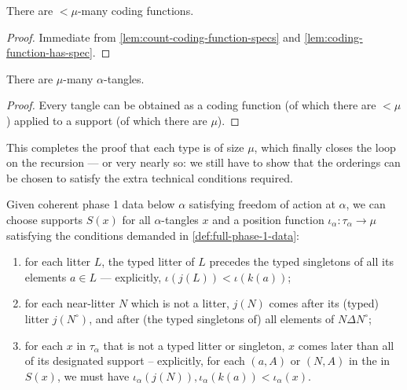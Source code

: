 \begin{corollary}
  \label{cor:count-coding-functions}
  There are $<\mu$-many coding functions.
\end{corollary}

\begin{proof}
  Immediate from \cref{lem:count-coding-function-specs} and \cref{lem:coding-function-has-spec}.
\end{proof}

\begin{corollary}
  \label{cor:count-tangles}
  There are $\mu$-many $\alpha$-tangles.
\end{corollary}

\begin{proof}
  Every tangle can be obtained as a coding function (of which there are $<\mu$) applied to a support (of which there are $\mu$).
\end{proof}

This completes the proof that each type is of size $\mu$, which finally closes the loop on the recursion --- or very nearly so: we still have to show that the orderings can be chosen to satisfy the extra technical conditions required.

\begin{lemma}
  \label{lem:position-functions-propagate}
  Given coherent phase 1 data below $\alpha$ satisfying freedom of action at $\alpha$, we can choose supports $S(x)$ for all $\alpha$-tangles $x$ and a position function $\iota_\alpha : \tau_\alpha \to \mu$ satisfying the conditions demanded in \cref{def:full-phase-1-data}:
  \begin{enumerate}
    \item for each litter $L$, the typed litter of $L$ precedes the typed singletons of all its elements $a \in L$ --- explicitly, $\iota(j(L)) < \iota(k(a))$;
    \item for each near-litter $N$ which is not a litter, $j(N)$ comes after its (typed) litter $j(N^\circ)$, and after (the typed singletons of) all elements of $N \Delta N^\circ$;

    \item for each $x$ in $\tau_\alpha$ that is not a typed litter or singleton, $x$ comes later than all of its designated support -- explicitly, for each $(a,A)$ or $(N,A)$ in the in $S(x)$, we must have $\iota_\alpha(j(N)), \iota_\alpha(k(a))<\iota_\alpha(x)$.
  \end{enumerate}
\end{lemma}

